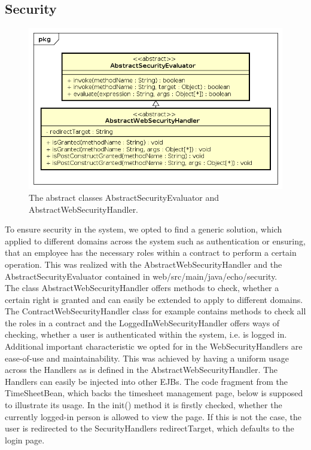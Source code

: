 \documentclass{article}
\begin{document}
\newpage

\subsection{Security}
\begin{figure}[h]
\caption{The abstract classes AbstractSecurityEvaluator and AbstractWebSecurityHandler.}
\centering
\includegraphics[width=\textwidth]{security_handler}
\end{figure}
To ensure security in the system, we opted to find a generic solution, which applied to different domains across the system such as authentication or ensuring, that an employee has the necessary roles within a contract to perform a certain operation. This was realized with the AbstractWebSecurityHandler and the AbstractSecurityEvaluator contained in web/src/main/java/echo/security.\\
The class AbstractWebSecurityHandler offers methods to check, whether a certain right is granted and can easily be extended to apply to different domains. The ContractWebSecurityHandler class for example contains methods to check all the roles in a contract and the LoggedInWebSecurityHandler offers ways of checking, whether a user is authenticated within the system, i.e. is logged in. \\
Additional important characteristic we opted for in the WebSecurityHandlers are ease-of-use and maintainability. This was achieved by having a uniform usage across the Handlers as is defined in the AbstractWebSecurityHandler. The Handlers can easily be injected into other EJBs. The code fragment from the TimeSheetBean, which backs the timesheet management page, below is supposed to illustrate its usage.
In the init() method it is firstly checked, whether the currently logged-in person is allowed to view the page. If this is not the case, the user is redirected to the SecurityHandlers redirectTarget, which defaults to the login page.\\
\end{document}
